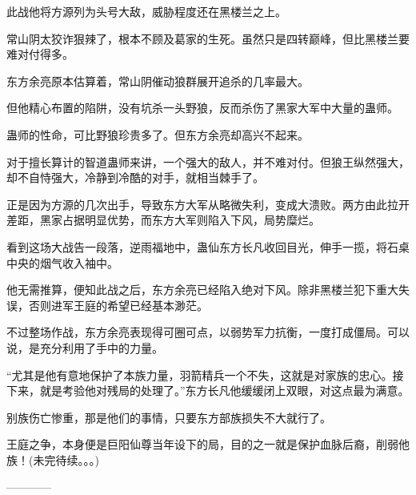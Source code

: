 \begin{this_body}
此战他将方源列为头号大敌，威胁程度还在黑楼兰之上。

常山阴太狡诈狠辣了，根本不顾及葛家的生死。虽然只是四转巅峰，但比黑楼兰要难对付得多。

东方余亮原本估算着，常山阴催动狼群展开追杀的几率最大。

但他精心布置的陷阱，没有坑杀一头野狼，反而杀伤了黑家大军中大量的蛊师。

蛊师的性命，可比野狼珍贵多了。但东方余亮却高兴不起来。

对于擅长算计的智道蛊师来讲，一个强大的敌人，并不难对付。但狼王纵然强大，却不自恃强大，冷静到冷酷的对手，就相当棘手了。

正是因为方源的几次出手，导致东方大军从略微失利，变成大溃败。两方由此拉开差距，黑家占据明显优势，而东方大军则陷入下风，局势糜烂。

看到这场大战告一段落，逆雨福地中，蛊仙东方长凡收回目光，伸手一揽，将石桌中央的烟气收入袖中。

他无需推算，便知此战之后，东方余亮已经陷入绝对下风。除非黑楼兰犯下重大失误，否则进军王庭的希望已经基本渺茫。

不过整场作战，东方余亮表现得可圈可点，以弱势军力抗衡，一度打成僵局。可以说，是充分利用了手中的力量。

“尤其是他有意地保护了本族力量，羽箭精兵一个不失，这就是对家族的忠心。接下来，就是考验他对残局的处理了。”东方长凡他缓缓闭上双眼，对这点最为满意。

别族伤亡惨重，那是他们的事情，只要东方部族损失不大就行了。

王庭之争，本身便是巨阳仙尊当年设下的局，目的之一就是保护血脉后裔，削弱他族！(未完待续。。。)

------------

\end{this_body}

